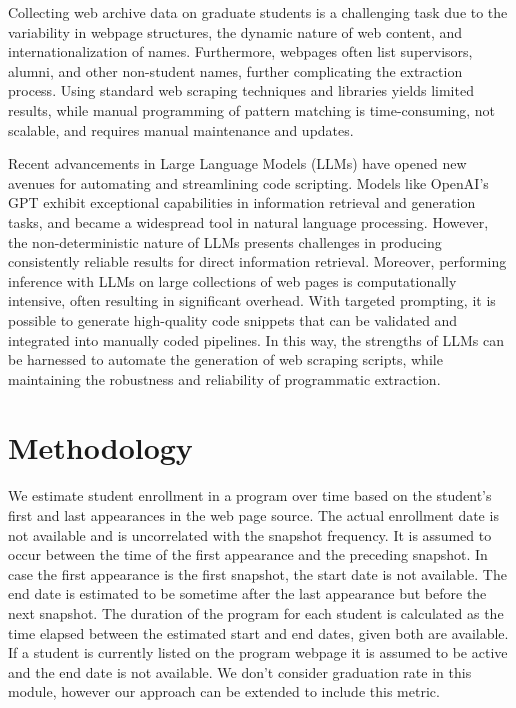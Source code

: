 \documentclass[11pt]{article}
\begin{document}
Collecting web archive data on graduate students is a challenging task due to the variability in webpage structures, the dynamic nature of web content, and internationalization of names.
Furthermore, webpages often list supervisors, alumni, and other non-student names, further complicating the extraction process.
Using standard web scraping techniques and libraries yields limited results, while manual programming of pattern matching is time-consuming, not scalable, and requires manual maintenance and updates.

Recent advancements in Large Language Models (LLMs) have opened new avenues for automating and streamlining code scripting.
Models like OpenAI's GPT exhibit exceptional capabilities in information retrieval and generation tasks, and became a widespread tool in natural language processing.
However, the non-deterministic nature of LLMs presents challenges in producing consistently reliable results for direct information retrieval.
Moreover, performing inference with LLMs on large collections of web pages is computationally intensive, often resulting in significant overhead.
With targeted prompting, it is possible to generate high-quality code snippets that can be validated and integrated into manually coded pipelines.
In this way, the strengths of LLMs can be harnessed to automate the generation of web scraping scripts, while maintaining the robustness and reliability of programmatic extraction.

\section{Methodology}

We estimate student enrollment in a program over time based on the student’s first and last appearances in the web page source.
The actual enrollment date is not available and is uncorrelated with the snapshot frequency.
It is assumed to occur between the time of the first appearance and the preceding snapshot.
In case the first appearance is the first snapshot, the start date is not available.
The end date is estimated to be sometime after the last appearance but before the next snapshot.
The duration of the program for each student is calculated as the time elapsed between the estimated start and end dates, given both are available.
If a student is currently listed on the program webpage it is assumed to be active and the end date is not available.
We don't consider graduation rate in this module, however our approach can be extended to include this metric.
\end{document}
